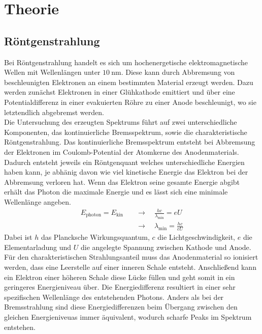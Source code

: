 \section{Theorie}

\subsection{Röntgenstrahlung}
Bei Röntgenstrahlung handelt es sich um hochenergetische elektromagnetische Wellen mit Wellenlängen unter $\SI{10}{\nano\meter}$. Diese kann
durch Abbremsung von beschleunigten Elektronen an einem bestimmten Material erzeugt werden. Dazu werden zunächst Elektronen in einer Glühkathode emittiert und über
eine Potentialdifferenz in einer evakuierten Röhre zu einer Anode beschleunigt, wo sie letztendlich abgebremst werden.
\\
Die Untersuchung des erzeugten Spektrums führt auf zwei unterschiedliche Komponenten, das kontinuierliche Bremsspektrum, sowie die charakteristische Röntgenstrahlung.
Das kontinuierliche Bremsspektrum entsteht bei Abbremsung der Elektronen im Coulomb-Potential der Atomkerne des Anodenmaterials. Dadurch entsteht jeweils ein Röntgenquant welches
 unterschiedliche Energien haben kann, je abhänig davon wie viel kinetische Energie das Elektron bei der Abbremsung verloren hat. Wenn das Elektron seine gesamte
Energie abgibt erhält das Photon die maximale Energie und es lässt sich eine minimale Wellenlänge angeben.
\\
\begin{align}
\nonumber
E_{\text{photon}} = E_{\text{kin}} \quad &\to \quad \frac{hc}{\lambda_{\text{min}}} = e U \\
&\to \quad \lambda_{\text{min}} = \frac{hc}{eU}
\end{align}
Dabei ist $h$ das Plancksche Wirkungsquantum, $c$ die Lichtgeschwindigkeit, $e$ die Elementarladung und $U$ die angelegte Spannung zwischen Kathode und Anode.
\\
Für den charakteristischen Strahlungsanteil muss das Anodenmaterial so ionisiert werden, dass eine Leerstelle auf einer inneren Schale entsteht. Anschließend kann ein Elektron einer höheren Schale diese Lücke füllen und geht
somit in ein geringeres Energieniveau über. Die Energiedifferenz resultiert in einer sehr spezifischen Wellenlänge des entstehenden Photons. Anders als bei der Bremsstrahlung sind diese Energiedifferenzen beim Übergang zwischen den
gleichen Energieniveuas immer äquivalent, wodurch scharfe Peaks im Spektrum entstehen.
\\
